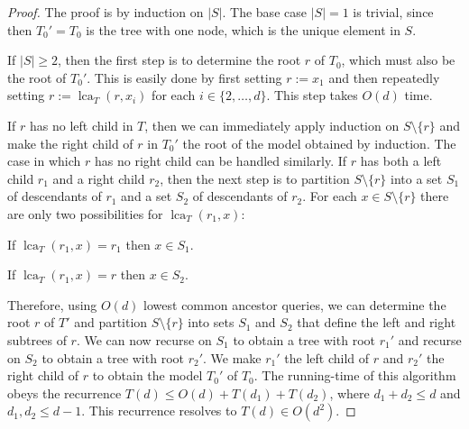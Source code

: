 \documentclass{patmorin}
\DeclareMathOperator{\lca}{lca}
\begin{document}
\begin{proof}
  The proof is by induction on $|S|$.  The base case $|S|=1$ is trivial, since then $T_0'=T_0$ is the tree with one node, which is the unique element in $S$.

  If $|S|\ge 2$, then the first step is to determine the root $r$ of $T_0$, which must also be the root of $T_0'$.  This is easily done by first setting $r:=x_1$ and then repeatedly setting $r:=\lca_{T}(r,x_i)$ for each $i\in\{2,\ldots,d\}$. This step takes $O(d)$ time.

  If $r$ has no left child in $T$, then we can immediately apply induction on $S\setminus\{r\}$ and make the right child of $r$ in $T_0'$ the root of the model obtained by induction.  The case in which $r$ has no right child can be handled similarly. If $r$ has both a left child $r_1$ and a right child $r_2$, then the next step is to partition $S\setminus\{r\}$ into a set $S_1$ of descendants of $r_1$ and a set $S_2$ of descendants of $r_2$.   For each $x\in S\setminus\{r\}$ there are only two possibilities for $\lca_{T}(r_1,x):$
  \begin{compactenum}
    \item If $\lca_{T}(r_1,x)=r_1$ then $x\in S_1$.
    \item If $\lca_{T}(r_1,x)=r$ then $x\in S_2$.
  \end{compactenum}
  Therefore, using $O(d)$ lowest common ancestor queries, we can determine the root $r$ of $T'$ and partition $S\setminus\{r\}$ into sets $S_1$ and $S_2$ that define the left and right subtrees of $r$.  We can now recurse on $S_1$ to obtain a tree with root $r_1'$ and recurse on $S_2$ to obtain a tree with root $r_2'$.  We make $r_1'$ the left child of $r$ and $r_2'$ the right child of $r$ to obtain the model $T_0'$ of $T_0$.  The running-time of this  algorithm obeys the recurrence $T(d)\le O(d)+T(d_1) + T(d_2)$, where $d_1 + d_2 \leq d$ and $d_1, d_2 \leq d-1$.  This recurrence resolves to $T(d)\in O(d^2)$.
\end{proof}

\end{document}
